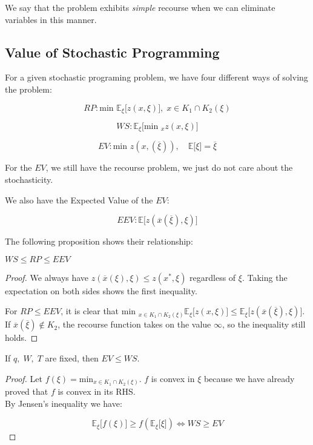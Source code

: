 We say that the problem exhibits \emph{simple} recourse when we can eliminate
variables in this manner.

\subsection{Value of Stochastic Programming}

For a given stochastic programing problem, we have four different ways of solving
the problem:

\[
RP : \textrm{min  } \mathbb{E}_\xi{\big[z(x,\xi)\big]}, \; x \in K_1 \cap K_2(\xi)
\]

\[
WS : \mathbb{E}_\xi \big[\textrm{min }_x z(x, \xi) \big]
\]

\[
EV : \textrm{min  } z(x, (\overline{\xi})), \quad \mathbb{E}\big[\xi\big] = \overline{\xi}
\]

For the $EV$, we still have the recourse problem, we just do not care about the
stochasticity.

We also have the Expected Value of the $EV$:

\[
EEV : \mathbb{E}\big[ z(\overline{x}(\overline{\xi}), \xi) \big]
\]

The following proposition shows their relationship:

\begin{proposition}
$WS \leq RP \leq EEV$
\end{proposition}

\begin{proof}
We always have $z(\overline{x}(\xi), \xi) \leq z(x^*, \xi)$ regardless of $\xi$. Taking
the expectation on both sides shows the first inequality. 

For $RP\leq EEV$, it is clear that $\textrm{min  }_{x \in K_1 \cap K_2(\xi)} \mathbb{E}_\xi{\big[z(x,\xi)\big]}
\leq \mathbb{E}_\xi \big[z(\overline{x}(\overline{\xi}), \xi)\big]$.
If $\overline{x}(\overline{\xi})\notin K_2$, the recourse function takes on the value
$\infty$, so the inequality still holds.
\end{proof}

\begin{proposition}
If $q,\; W,\; T$ are fixed, then $EV \leq WS$.
\end{proposition}

\begin{proof}
Let $f(\xi) = \textrm{min}_{x\in K_1 \cap K_2(\xi)}$. $f$ is convex in $\xi$ because we
have already proved that $f$ is convex in its RHS.\\
By Jensen's inequality we have:

\[
\mathbb{E}_\xi \big[f(\xi)\big] \geq f(\mathbb{E}_\xi\big[\xi\big])
\Leftrightarrow WS \geq EV
\]

\end{proof}

